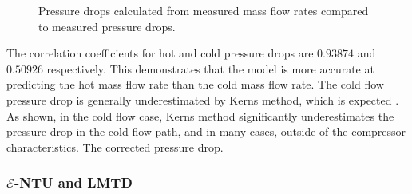 \documentclass{article}
\begin{document}
\begin{figure}[H]
  \caption{Pressure drops calculated from measured mass flow rates compared to measured pressure drops.}
  \label{fig:pressure_drops}

\end{figure}

The correlation coefficients for hot and cold pressure drops are $\mathbf{0.93874}$ and $\mathbf{0.50926}$ respectively.
This demonstrates that the model is more accurate at predicting the hot mass flow rate than the cold mass flow rate.
The cold flow pressure drop is generally underestimated by Kerns method, which is expected \cite{HE_design}.
As shown, in the cold flow case, Kerns method significantly underestimates the pressure drop in the cold flow path, and in many cases, outside of the compressor characteristics.
The corrected pressure drop.

\subsubsection{$\mathcal{E}$-NTU and LMTD}
\end{document}
